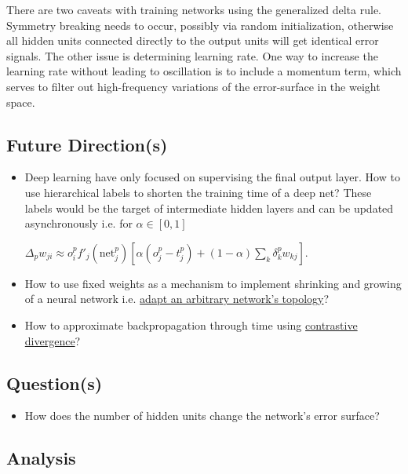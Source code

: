 \documentclass[]{article}
\begin{document}
There are two caveats with training networks using the generalized delta
rule. Symmetry breaking needs to occur, possibly via random
initialization, otherwise all hidden units connected directly to the
output units will get identical error signals. The other issue is
determining learning rate. One way to increase the learning rate without
leading to oscillation is to include a momentum term, which serves to
filter out high-frequency variations of the error-surface in the weight
space.

\subsection{Future Direction(s)}\label{header-n44}

\begin{itemize}
\item
  Deep learning have only focused on supervising the final output layer.
  How to use hierarchical labels to shorten the training time of a deep
  net? These labels would be the target of intermediate hidden layers
  and can be updated asynchronously i.e. for \(\alpha \in [0, 1]\)

  \(\Delta_p w_{ji} \approx o^p_i f'_j\left( \text{net}^p_j \right) \left[ \alpha \left( o^p_j - t^p_j \right) + (1 - \alpha) \sum_k \delta^p_k w_{kj} \right].\)
\item
  How to use fixed weights as a mechanism to implement shrinking and
  growing of a neural network i.e.
  \href{http://allthingsphi.com/blog/2016/11/30/information-processing-in-dynamical-systems-foundations-of-harmony-theory.html}{adapt
  an arbitrary network's topology}?
\item
  How to approximate backpropagation through time using
  \href{http://allthingsphi.com/blog/2016/11/23/training-products-of-experts-by-minimizing-contrastive-divergence.html}{contrastive
  divergence}?
\end{itemize}

\subsection{Question(s)}\label{header-n57}

\begin{itemize}
\item
  How does the number of hidden units change the network's error
  surface?
\end{itemize}

\subsection{Analysis}\label{header-n62}
\end{document}
